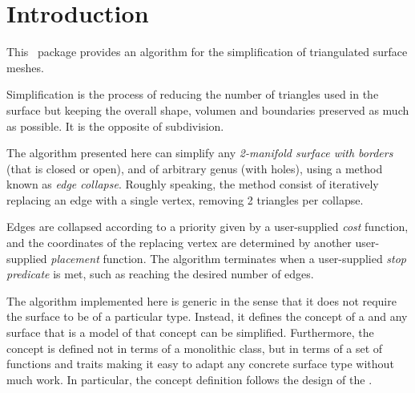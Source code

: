 
\section{Introduction}

This \cgal\ package provides an algorithm for the simplification of triangulated surface meshes.

Simplification is the process of reducing the number of triangles used in the surface but keeping the overall shape, volumen and boundaries preserved as much as possible. It is the opposite of subdivision.


The algorithm presented here can simplify any {\em 2-manifold surface with borders} (that is closed or open), and of arbitrary genus (with holes), using a method known as {\em edge collapse}. Roughly speaking, the method consist of iteratively replacing an edge with a single vertex, removing 2 triangles per collapse.


Edges are collapsed according to a priority given by a user-supplied {\em cost} function, and the coordinates of the replacing vertex are determined by another user-supplied {\em placement} function. The algorithm terminates when a user-supplied {\em stop predicate} is met, such as reaching the desired number of edges.

The algorithm implemented here is generic in the sense that it does not require the surface to be of a particular type. Instead, it defines the concept of a  and any surface that is a model of that concept can be simplified. Furthermore, the concept is defined not in terms of a monolithic class, but in terms of a set of functions and traits making it easy to adapt any concrete surface type without much work. In particular, the concept definition follows the design of the 
 .

